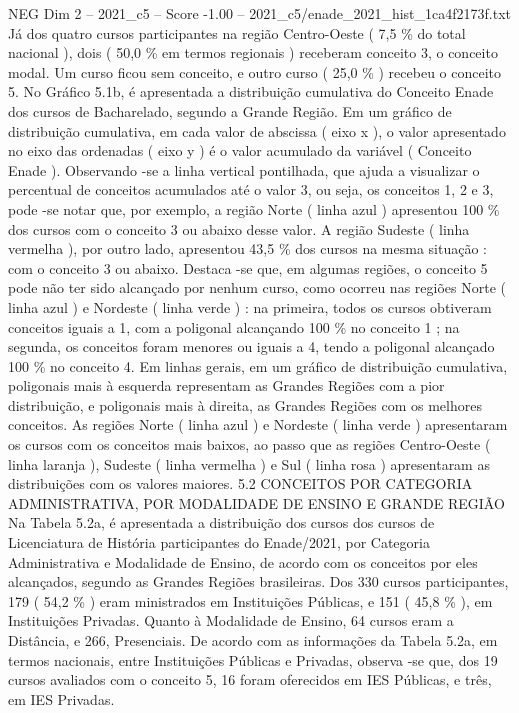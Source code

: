 \begin{textsample}{NEG Dim 2 – 2021\_c5 – Score -1.00 – 2021\_c5/enade\_2021\_hist\_1ca4f2173f.txt}
Já dos quatro cursos participantes na região Centro-Oeste ( 7,5 \% do total nacional ), dois ( 50,0 \% em termos regionais ) receberam conceito 3, o conceito modal.
Um curso ficou sem conceito, e outro curso ( 25,0 \% ) recebeu o conceito 5.
No Gráfico 5.1b, é apresentada a distribuição cumulativa do Conceito Enade dos cursos de Bacharelado, segundo a Grande Região.
Em um gráfico de distribuição cumulativa, em cada valor de abscissa ( eixo x ), o valor apresentado no eixo das ordenadas ( eixo y ) é o valor acumulado da variável ( Conceito Enade ).
Observando -se a linha vertical pontilhada, que ajuda a visualizar o percentual de conceitos acumulados até o valor 3, ou seja, os conceitos 1, 2 e 3, pode -se notar que, por exemplo, a região Norte ( linha azul ) apresentou 100 \% dos cursos com o conceito 3 ou abaixo desse valor.
A região Sudeste ( linha vermelha ), por outro lado, apresentou 43,5 \% dos cursos na mesma situação : com o conceito 3 ou abaixo.
Destaca -se que, em algumas regiões, o conceito 5 pode não ter sido alcançado por nenhum curso, como ocorreu nas regiões Norte ( linha azul ) e Nordeste ( linha verde ) : na primeira, todos os cursos obtiveram conceitos iguais a 1, com a poligonal alcançando 100 \% no conceito 1 ; na segunda, os conceitos foram menores ou iguais a 4, tendo a poligonal alcançado 100 \% no conceito 4.
Em linhas gerais, em um gráfico de distribuição cumulativa, poligonais mais à esquerda representam as Grandes Regiões com a pior distribuição, e poligonais mais à direita, as Grandes Regiões com os melhores conceitos.
As regiões Norte ( linha azul ) e Nordeste ( linha verde ) apresentaram os cursos com os conceitos mais baixos, ao passo que as regiões Centro-Oeste ( linha laranja ), Sudeste ( linha vermelha ) e Sul ( linha rosa ) apresentaram as distribuições com os valores maiores. 5.2 CONCEITOS POR CATEGORIA ADMINISTRATIVA, POR MODALIDADE DE ENSINO E GRANDE REGIÃO Na Tabela 5.2a, é apresentada a distribuição dos cursos dos cursos de Licenciatura de História participantes do Enade/2021, por Categoria Administrativa e Modalidade de Ensino, de acordo com os conceitos por eles alcançados, segundo as Grandes Regiões brasileiras.
Dos 330 cursos participantes, 179 ( 54,2 \% ) eram ministrados em Instituições Públicas, e 151 ( 45,8 \% ), em Instituições Privadas.
Quanto à Modalidade de Ensino, 64 cursos eram a Distância, e 266, Presenciais.
De acordo com as informações da Tabela 5.2a, em termos nacionais, entre Instituições Públicas e Privadas, observa -se que, dos 19 cursos avaliados com o conceito 5, 16 foram oferecidos em IES Públicas, e três, em IES Privadas.

\end{textsample}
